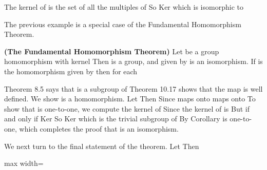 \documentclass[11pt,oneside]{article}
\begin{document}
\begin{BookBody}

The kernel of \BookInline{\phi } is the set of all the multiples of  So Ker which is isomorphic to \BookEnd{\blacktriangle}

The previous example is a special case of the Fundamental Homomorphism Theorem.

 \textbf{(The Fundamental Homomorphism Theorem)} Let  be a group homomorphism with kernel  Then \BookInline{\phi [G]} is a group, and  given by  is an isomorphism. If  is the homomorphism given by  then  for each 

 Theorem 8.5 says that \BookInline{\phi [G]} is a subgroup of  Theorem 10.17 shows that the map  is well defined. We show \BookInline{\mu } is a homomorphism. Let  Then  Since \BookInline{\phi } maps  onto \BookInline{\phi [G],\allowbreak \mu } maps  onto  To show that \BookInline{\mu } is one-to-one, we compute the kernel of  Since  the kernel of \BookInline{\mu } is  But  if and only if  Ker So Ker which is the trivial subgroup of  By Corollary \BookInline{10.19\mu } is one-to-one, which completes the proof that \BookInline{\mu } is an isomorphism.

We next turn to the final statement of the theorem. Let  Then

\begin{center}\begin{adjustbox}{max width=\linewidth}\end{adjustbox}\end{center} \BookEnd{\blacklozenge}


\end{BookBody}
\end{document}
